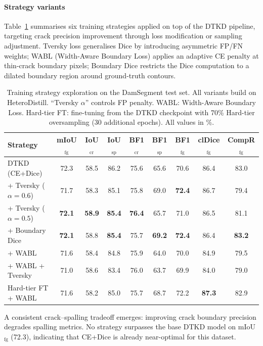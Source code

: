 \documentclass[review,authoryear]{elsarticle}
\begin{document}
\paragraph{Strategy variants}
Table~\ref{tab:supp_strategy} summarises six training strategies applied on top of the DTKD pipeline, targeting crack precision improvement through loss modification or sampling adjustment.
Tversky loss \citep{salehi2017tversky} generalises Dice by introducing asymmetric FP/FN weights; WABL (Width-Aware Boundary Loss) applies an adaptive CE penalty at thin-crack boundary pixels; Boundary Dice restricts the Dice computation to a dilated boundary region around ground-truth contours.

\begin{table}[t]
\centering
\caption{Training strategy exploration on the DamSegment test set. All variants build on HeteroDistill. ``Tversky $\alpha$'' controls FP penalty. WABL: Width-Aware Boundary Loss. Hard-tier FT: fine-tuning from the DTKD checkpoint with 70\% Hard-tier oversampling (30 additional epochs). All values in \%.}
\label{tab:supp_strategy}
\begin{tabular}{lcccccccc}
\toprule
Strategy & mIoU$_{\text{fg}}$ & IoU$_{\text{cr}}$ & IoU$_{\text{sp}}$ & BF1$_{\text{cr}}$ & BF1$_{\text{sp}}$ & BF1$_{\text{fg}}$ & clDice$_{\text{fg}}$ & CompR$_{\text{fg}}$ \\
\midrule
DTKD (CE+Dice) & 72.3 & 58.5 & 86.2 & 75.6 & 65.6 & 70.6 & 86.4 & 83.0 \\
\midrule
+ Tversky ($\alpha{=}0.6$) & 71.7 & 58.3 & 85.1 & 75.8 & 69.0 & \textbf{72.4} & 86.7 & 79.4 \\
+ Tversky ($\alpha{=}0.5$) & \textbf{72.1} & \textbf{58.9} & \textbf{85.4} & \textbf{76.4} & 65.7 & 71.0 & 86.5 & 81.1 \\
+ Boundary Dice & \textbf{72.1} & 58.8 & \textbf{85.4} & 75.7 & \textbf{69.2} & \textbf{72.4} & 86.4 & \textbf{83.2} \\
+ WABL & 71.6 & 58.4 & 84.8 & 75.9 & 64.0 & 70.0 & 84.9 & 79.5 \\
+ WABL + Tversky & 71.0 & 58.6 & 83.4 & 76.0 & 63.7 & 69.9 & 84.0 & 79.0 \\
\midrule
Hard-tier FT + WABL & 71.6 & 58.2 & 85.0 & 75.7 & 68.7 & 72.2 & \textbf{87.3} & 82.9 \\
\bottomrule
\end{tabular}
\end{table}

A consistent crack--spalling tradeoff emerges: improving crack boundary precision degrades spalling metrics. No strategy surpasses the base DTKD model on mIoU$_{\text{fg}}$ (72.3), indicating that CE+Dice is already near-optimal for this dataset.
\end{document}
